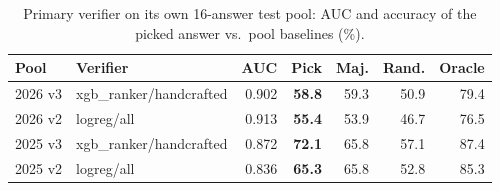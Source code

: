 \begin{table}[!t]
\centering
\footnotesize
\caption{Primary verifier on its own 16-answer test pool: AUC and accuracy of the picked answer vs.\ pool baselines (\%).}
\label{tab:ver}
\setlength{\tabcolsep}{3.5pt}
\begin{tabular}{llrrrrr}
\toprule
Pool & Verifier & AUC & Pick & Maj. & Rand. & Oracle \\
\midrule
2026 v3 & xgb\_ranker/handcrafted & 0.902 & \textbf{58.8} & 59.3 & 50.9 & 79.4 \\
2026 v2 & logreg/all & 0.913 & \textbf{55.4} & 53.9 & 46.7 & 76.5 \\
2025 v3 & xgb\_ranker/handcrafted & 0.872 & \textbf{72.1} & 65.8 & 57.1 & 87.4 \\
2025 v2 & logreg/all & 0.836 & \textbf{65.3} & 65.8 & 52.8 & 85.3 \\
\bottomrule
\end{tabular}
\end{table}
